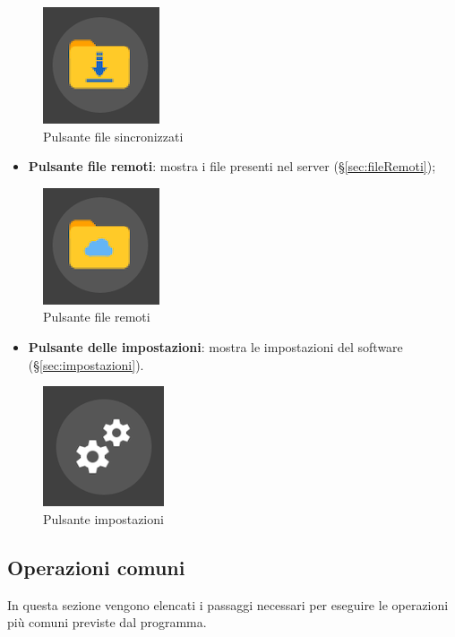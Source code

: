 \begin{figure}[H]
    \centering
    \includegraphics[scale = 1]{components/img/pulsanteFileS.png}
    \caption{Pulsante file sincronizzati}
    \label{fig:PfileSync}
\end{figure}
\begin{itemize}
\item \textbf{Pulsante file remoti}: mostra i file presenti nel server (\S{}\ref{sec:fileRemoti}); \
\end{itemize}
\begin{figure}[H]
    \centering
    \includegraphics[scale = 1]{components/img/pulsanteFileR.png}
    \caption{Pulsante file remoti}
    \label{fig:PfileRem}
\end{figure}
\begin{itemize}
\item \textbf{Pulsante delle impostazioni}: mostra le impostazioni del software (\S{}\ref{sec:impostazioni}). \
\end{itemize}
\begin{figure}[H]
    \centering
    \includegraphics[scale = 1]{components/img/pulsanteImpostazioni.png}
    \caption{Pulsante impostazioni}
    \label{fig:PImp}
\end{figure}

\subsection{Operazioni comuni}
In questa sezione vengono elencati i passaggi necessari per eseguire le operazioni più comuni previste dal programma.
